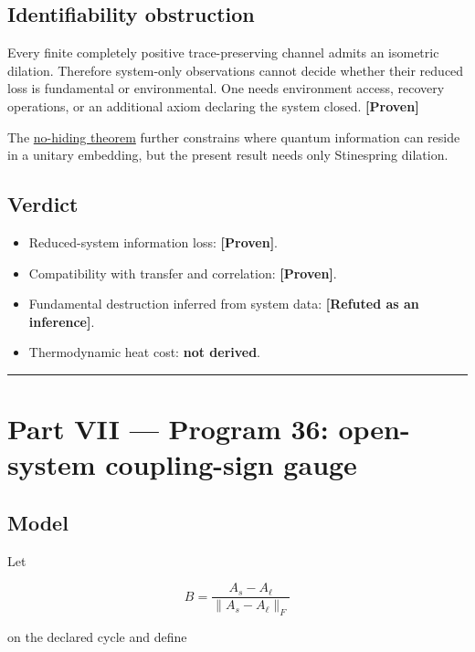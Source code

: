 \documentclass[11pt,a4paper,openany]{report}
\newcommand{\statusProven}{\textcolor{fingreen}{[Proven]}}
\begin{document}
\section{Identifiability obstruction}

Every finite completely positive trace-preserving channel admits an isometric dilation. Therefore system-only observations cannot decide whether their reduced loss is fundamental or environmental. One needs environment access, recovery operations, or an additional axiom declaring the system closed. \textbf{\statusProven{}}

The \href{https://doi.org/10.1103/PhysRevLett.98.080502}{no-hiding theorem} further constrains where quantum information can reside in a unitary embedding, but the present result needs only Stinespring dilation.

\section{Verdict}

\begin{itemize}
\item 
Reduced-system information loss: \textbf{\statusProven{}}.

\item 
Compatibility with transfer and correlation: \textbf{\statusProven{}}.

\item 
Fundamental destruction inferred from system data: \textbf{[Refuted as an inference]}.

\item 
Thermodynamic heat cost: \textbf{not derived}.

\end{itemize}

\par\medskip\hrule\medskip

\chapter{Part VII — Program 36: open-system coupling-sign gauge}

\section{Model}

Let

\[
B=\frac{A_s-A_\ell}{\|A_s-A_\ell\|_F}
\]

on the declared cycle and define
\end{document}
